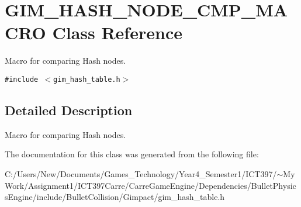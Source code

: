 \hypertarget{class_g_i_m___h_a_s_h___n_o_d_e___c_m_p___m_a_c_r_o}{
\section{GIM\_\-HASH\_\-NODE\_\-CMP\_\-MACRO Class Reference}
\label{class_g_i_m___h_a_s_h___n_o_d_e___c_m_p___m_a_c_r_o}
}
Macro for comparing Hash nodes.  


{\tt \#include $<$gim\_\-hash\_\-table.h$>$}



\subsection{Detailed Description}
Macro for comparing Hash nodes. 

The documentation for this class was generated from the following file:\begin{CompactItemize}
\item 
C:/Users/New/Documents/Games\_\-Technology/Year4\_\-Semester1/ICT397/$\sim$My Work/Assignment1/ICT397Carre/CarreGameEngine/Dependencies/BulletPhysicsEngine/include/BulletCollision/Gimpact/gim\_\-hash\_\-table.h\end{CompactItemize}
